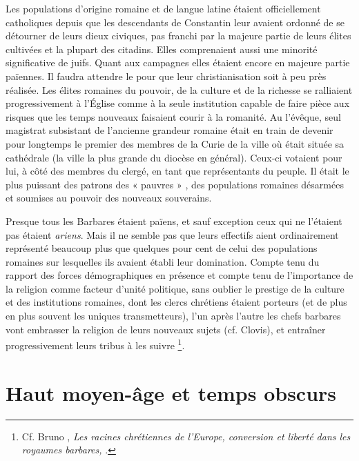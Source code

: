  Les populations d'origine romaine et de langue latine étaient officiellement catholiques depuis que les descendants de Constantin leur avaient ordonné de se détourner de leurs dieux civiques, pas franchi par la majeure partie de leurs élites cultivées et la plupart des citadins. Elles comprenaient aussi une minorité significative de juifs. Quant aux campagnes elles étaient encore en majeure partie païennes. Il faudra attendre le  pour que leur christianisation soit à peu près réalisée. Les élites romaines du pouvoir, de la culture et de la richesse se ralliaient progressivement à l’Église comme à la seule institution capable de faire pièce aux risques que les temps nouveaux faisaient courir à la romanité. Au  l'évêque, seul magistrat subsistant de l'ancienne grandeur romaine était en train de devenir pour longtemps le premier des membres de la Curie de la ville où était située sa cathédrale (la ville la plus grande du diocèse en général). Ceux-ci votaient pour lui, à côté des membres du clergé, en tant que représentants du peuple. Il était le plus puissant des patrons des « pauvres » , des populations romaines désarmées et soumises au pouvoir des nouveaux souverains. 

 Presque tous les Barbares étaient païens, et sauf exception ceux qui ne l'étaient pas étaient \emph{ariens}. Mais il ne semble pas que leurs effectifs aient ordinairement représenté beaucoup plus que quelques pour cent de celui des populations romaines sur lesquelles ils avaient établi leur domination. Compte tenu du rapport des forces démographiques en présence et compte tenu de l'importance de la religion comme facteur d'unité politique, sans oublier le prestige de la culture et des institutions romaines, dont les clercs chrétiens étaient porteurs (et de plus en plus souvent les uniques transmetteurs), l'un après l'autre les chefs barbares vont embrasser la religion de leurs nouveaux sujets (cf. Clovis), et entraîner progressivement leurs tribus à les suivre
\footnote{Cf. Bruno , \emph{Les racines chrétiennes de l'Europe, conversion et liberté dans les royaumes barbares, }.}. 


\section{Haut moyen-âge et temps obscurs}

